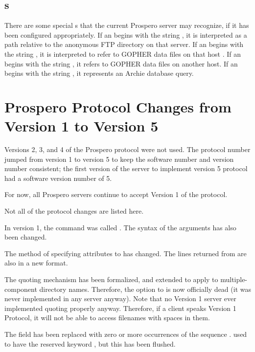 \section{\protect{}s}

There are some special s that the current Prospero
server may recognize, if it has been configured appropriately.  If an
 begins with the string , it is interpreted
as a path relative to the anonymous FTP directory on that server.  If
an  begins with the string
\zoos\lit{(}\lit{)}\zooe, it is
interpreted to refer to GOPHER data files on that host .  If an
 begins with the string , it refers
to GOPHER data files on another host.  If an 
begins with the string , it represents an Archie database
query.


\chapter{Prospero Protocol Changes from Version 1 to Version 5}

Versions 2, 3, and 4 of the Prospero protocol were not used.  The
protocol number jumped from version 1 to version 5 to keep the
software number and version number consistent; the first version of
the server to implement version 5 protocol had a software version
number of 5.

For now, all Prospero servers continue to accept Version 1 of the
protocol.

Not all of the protocol changes are listed here.

In version 1, the  command was called .
The syntax of the arguments has also been changed.

The method of specifying attributes to  has changed.  The
lines returned from  are also in a new format.

The quoting mechanism has been formalized, and extended to apply to
multiple-component directory names.  Therefore, the 
option to  is now officially dead (it was never implemented
in any server anyway).  Note that no Version 1 server ever implemented
quoting properly anyway.  Therefore, if a client speaks Version 1
Protocol, it will not be able to access filenames with spaces in them.


The  field has been replaced with zero or more
occurrences of the sequence   .
 used to have the reserved keyword , but
this has been flushed.

